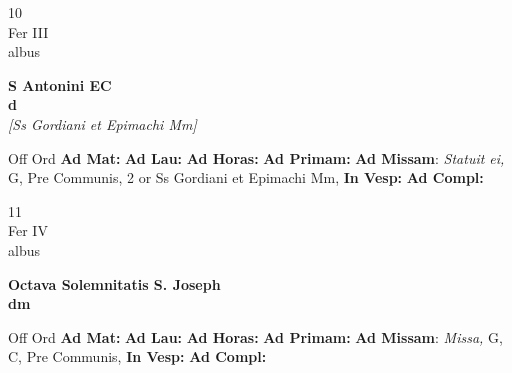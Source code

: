 \documentclass[10pt, openany]{book}
\begin{document}
    \begin{center}
        \begin{minipage}{3.5in}
            \vspace{2em}
            \begin{minipage}{0.5in}
                {\Huge 10} \\
                {\normalsize Fer III} \\
                {\normalsize albus}
            \end{minipage}
            \begin{minipage}{3.0in}
                \textbf{ \large S Antonini EC \\
                \textnormal{\normalsize d}} \\ \textit{[Ss Gordiani et Epimachi Mm]} \\ 
            \end{minipage}
            \begin{justify}Off Ord
                \textbf{Ad Mat: }
                \textbf{Ad Lau: }
                \textbf{Ad Horas: }
                \textbf{Ad Primam: }\textbf{Ad Missam}: \textit{Statuit ei,} G, Pre Communis, 2 or Ss Gordiani et Epimachi Mm,  
                \textbf{In Vesp: }
                \textbf{Ad Compl: }
            \end{justify}
        \end{minipage}
    \end{center}

    \begin{center}
        \begin{minipage}{3.5in}
            \vspace{2em}
            \begin{minipage}{0.5in}
                {\Huge 11} \\
                {\normalsize Fer IV} \\
                {\normalsize albus}
            \end{minipage}
            \begin{minipage}{3.0in}
                \textbf{ \large Octava Solemnitatis S. Joseph \\
                \textnormal{\normalsize dm}} \\ 
            \end{minipage}
            \begin{justify}Off Ord
                \textbf{Ad Mat: }
                \textbf{Ad Lau: }
                \textbf{Ad Horas: }
                \textbf{Ad Primam: }\textbf{Ad Missam}: \textit{Missa,} G, C, Pre Communis,  
                \textbf{In Vesp: }
                \textbf{Ad Compl: }
            \end{justify}
        \end{minipage}
    \end{center}
\end{document}
